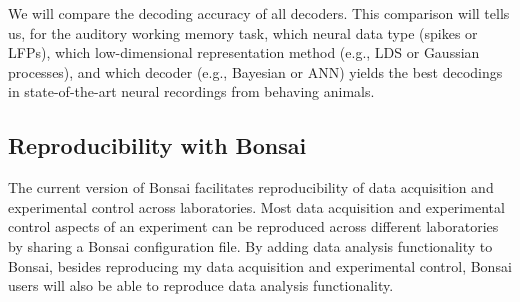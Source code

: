 We will compare the decoding accuracy of all decoders. This comparison will
tells us, for the auditory working memory task, which neural data type (spikes
or LFPs), which low-dimensional representation method (e.g., LDS or Gaussian
processes), and which decoder (e.g., Bayesian or ANN) yields the best decodings
in state-of-the-art neural recordings from behaving animals.

\subsection{Reproducibility with Bonsai}
\label{sec:reproducibility}

The current version of Bonsai facilitates reproducibility of data acquisition
and experimental control across laboratories. Most data acquisition and
experimental control aspects of an experiment can be reproduced across
different laboratories by sharing a Bonsai configuration file.
%
By adding data analysis functionality to Bonsai, besides reproducing my data
acquisition and experimental control, Bonsai users will also be able to reproduce
data analysis functionality.

